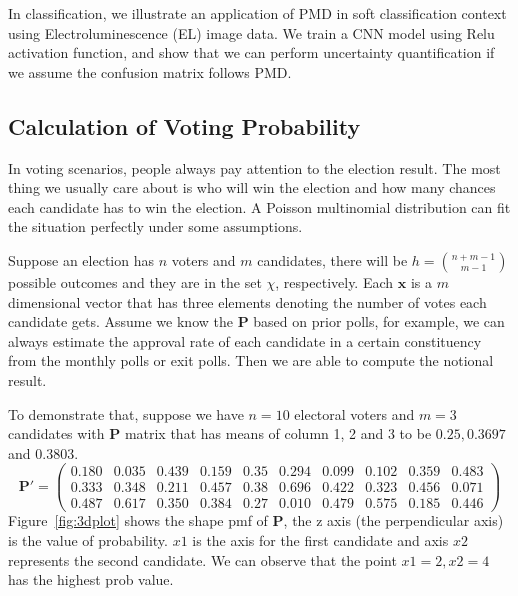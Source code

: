 \documentclass[12pt]{article}
\newcommand{\Pmat}{\mathbf{P}}
\newcommand{\PMD}{\textrm{PMD}}
\newcommand{\xvec}{\boldsymbol{x}}
\begin{document}
In classification, we illustrate an application of $\PMD$ in soft classification context using Electroluminescence (EL) image data. We train a CNN model using Relu activation function, and show that we can perform uncertainty quantification if we assume the confusion matrix follows $\PMD$.


\subsection{Calculation of Voting Probability}
In voting scenarios, people always pay attention to the election result. The most thing we usually care about is who will win the election and how many chances each candidate has to win the election. A Poisson multinomial distribution can fit the situation perfectly under some assumptions.

Suppose an election has $n$ voters and $m$ candidates, there will be $h = \binom{n+m-1}{m-1}$ possible outcomes and they are in the set $\chi$, respectively. Each $\xvec$ is a $m$ dimensional vector that has three elements denoting the number of votes each candidate gets. Assume we know the $\Pmat$ based on prior polls, for example, we can always estimate the approval rate of each candidate in a certain constituency from the monthly polls or exit polls. Then we are able to compute the notional result.

To demonstrate that, suppose we have $n=10$ electoral voters and $m=3$ candidates with $\Pmat$ matrix that has means of column 1, 2 and 3 to be $0.25, 0.3697$ and $0.3803$.
\begin{equation*}
\Pmat' = \begin{pmatrix}
 0.180 &0.035 &0.439 &0.159 &0.35& 0.294 &0.099& 0.102& 0.359 &0.483\\
 0.333 &0.348 &0.211 &0.457 &0.38& 0.696 &0.422 &0.323 &0.456 &0.071\\
 0.487 &0.617& 0.350 &0.384& 0.27& 0.010 &0.479& 0.575& 0.185& 0.446
 \end{pmatrix}
\end{equation*}
Figure~\ref{fig:3dplot} shows the shape pmf of $\Pmat$, the z axis (the perpendicular axis) is the value of probability. $x1$ is the axis for the first candidate and axis $x2$ represents the second candidate. We can observe that the point $x1=2, x2=4$ has the highest prob value.
\end{document}
